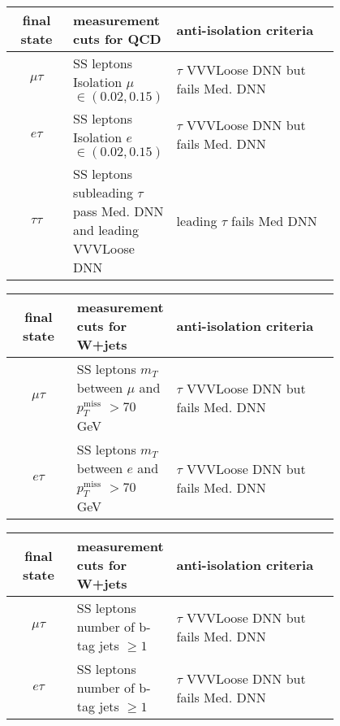 \begin{table}[h!tbp]
\centering
{}
\begin{tabular*}{0.8\textwidth}{c|p{0.3\linewidth}|p{0.5\linewidth}}
\hline
final state      & measurement cuts for QCD & anti-isolation criteria\\\hline 
$\mu\tau$  & SS leptons Isolation $\mu$ $\in(0.02,0.15)$ & $\tau$ VVVLoose DNN but fails Med. DNN  \\\hline
$ e \tau$  & SS leptons Isolation $e$ $\in(0.02,0.15)$ & $\tau$ VVVLoose DNN but fails Med. DNN \\\hline
$\tau\tau$ & SS leptons subleading $\tau$ pass Med. DNN and leading VVVLoose DNN & leading $\tau$ fails Med DNN \\\hline
\end{tabular*}
\end{table}

\begin{table}[h!tbp]
\centering
{}
\begin{tabular*}{0.8\textwidth}{c|p{0.3\linewidth}|p{0.5\linewidth}}
\hline
final state      & measurement cuts for W+jets & anti-isolation criteria\\\hline 
$\mu\tau$  & SS leptons $m_T$ between $\mu$ and $p_T^{\text{miss}}$ $> 70 $ GeV  & $\tau$ VVVLoose DNN but fails Med. DNN  \\\hline
$ e \tau$  & SS leptons $m_T$ between $e$ and $p_T^{\text{miss}}$ $> 70 $ GeV  & $\tau$ VVVLoose DNN but fails Med. DNN \\\hline
\end{tabular*}
\end{table}

\begin{table}[h!tbp]
\centering
{}
\begin{tabular*}{0.8\textwidth}{c|p{0.3\linewidth}|p{0.5\linewidth}}
\hline
final state      & measurement cuts for W+jets & anti-isolation criteria \\\hline 
$\mu\tau$  & SS leptons number of b-tag jets $\geq 1 $ & $\tau$ VVVLoose DNN but fails Med. DNN \\\hline
$ e \tau$  & SS leptons number of b-tag jets $\geq 1 $ & $\tau$ VVVLoose DNN but fails Med. DNN \\\hline
\end{tabular*}
\end{table}

